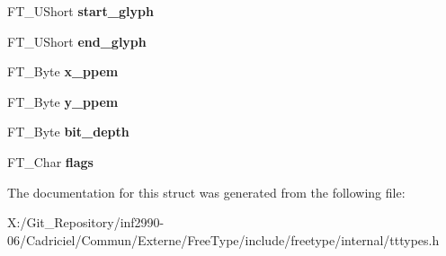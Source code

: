 \begin{DoxyCompactItemize}
\item 
\hypertarget{struct_t_t___s_bit___strike_rec___a05032d4092eef7e7214bb82d4113d8b9}{F\-T\-\_\-\-U\-Short {\bfseries start\-\_\-glyph}}\label{struct_t_t___s_bit___strike_rec___a05032d4092eef7e7214bb82d4113d8b9}

\item 
\hypertarget{struct_t_t___s_bit___strike_rec___a1af21e0ef936193b22575ea75bad487f}{F\-T\-\_\-\-U\-Short {\bfseries end\-\_\-glyph}}\label{struct_t_t___s_bit___strike_rec___a1af21e0ef936193b22575ea75bad487f}

\item 
\hypertarget{struct_t_t___s_bit___strike_rec___a2a1b17c24df2084fe485aefe8f34e7d4}{F\-T\-\_\-\-Byte {\bfseries x\-\_\-ppem}}\label{struct_t_t___s_bit___strike_rec___a2a1b17c24df2084fe485aefe8f34e7d4}

\item 
\hypertarget{struct_t_t___s_bit___strike_rec___ad618814b841b86e7763f1aa371e04fed}{F\-T\-\_\-\-Byte {\bfseries y\-\_\-ppem}}\label{struct_t_t___s_bit___strike_rec___ad618814b841b86e7763f1aa371e04fed}

\item 
\hypertarget{struct_t_t___s_bit___strike_rec___ac57b360af4620bd06251d098f5da23bb}{F\-T\-\_\-\-Byte {\bfseries bit\-\_\-depth}}\label{struct_t_t___s_bit___strike_rec___ac57b360af4620bd06251d098f5da23bb}

\item 
\hypertarget{struct_t_t___s_bit___strike_rec___a38735f8c00b23deb25ffab798c0aa7b7}{F\-T\-\_\-\-Char {\bfseries flags}}\label{struct_t_t___s_bit___strike_rec___a38735f8c00b23deb25ffab798c0aa7b7}

\end{DoxyCompactItemize}


The documentation for this struct was generated from the following file\-:\begin{DoxyCompactItemize}
\item 
X\-:/\-Git\-\_\-\-Repository/inf2990-\/06/\-Cadriciel/\-Commun/\-Externe/\-Free\-Type/include/freetype/internal/tttypes.\-h\end{DoxyCompactItemize}
